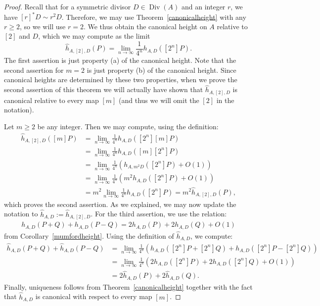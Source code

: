 \documentclass[a4paper, 12pt]{amsart}
\theoremstyle{definition}
\theoremstyle{plain}
\theoremstyle{plain}
\theoremstyle{plain}
\theoremstyle{plain}
\theoremstyle{remark}
\theoremstyle{remark}
\theoremstyle{plain}
\newcommand{\thmref}[1]{Theorem~\ref{#1}}
\newcommand{\corref}[1]{Corollary~\ref{#1}}
\DeclareMathOperator{\Div}{Div}
\begin{document}
	\begin{proof}
		Recall that for a symmetric divisor $D\in\Div(A)$ and an integer $r$, we have $[r]^*D\sim r^2D$. Therefore, we may use \thmref{canonicalheight} with any $r\ge 2$, so we will use $r=2$. We thus obtain the canonical height on $A$ relative to $[2]$ and $D$, which we may compute as the limit
		\begin{equation*}
			\hat{h}_{A,[2],D}(P)=\lim\limits_{n\to\infty}\frac{1}{4^n}h_{A,D}([2^n]P).
		\end{equation*}
		The first assertion is just property (a) of the canonical height. Note that the second assertion for $m=2$ is just property (b) of the canonical height. Since canonical heights are determined by these two properties, when we prove the second assertion of this theorem we will actually have shown that $\hat{h}_{A,[2],D}$ is canonical relative to every map $[m]$ (and thus we will omit the $[2]$ in the notation).
		
		Let $m\ge2$ be any integer. Then we may compute, using the definition:
		\begin{align*}
			\hat{h}_{A,[2],D}([m]P)&=\lim\limits_{n\to\infty}\frac{1}{4^n}h_{A,D}([2^n][m]P)\\
			&=\lim\limits_{n\to\infty}\frac{1}{4^n}h_{A,D}([m][2^n]P)\\
			&=\lim\limits_{n\to\infty}\frac{1}{4^n}\left(h_{A,m^2D}([2^n]P)+O(1)\right)\\
			&=\lim\limits_{n\to\infty}\frac{1}{4^n}\left(m^2h_{A,D}([2^n]P)+O(1)\right)\\
			&=m^2\lim\limits_{n\to\infty}\frac{1}{4^n}h_{A,D}([2^n]P)=m^2\hat{h}_{A,[2],D}(P),
		\end{align*}
		which proves the second assertion. As we explained, we may now update the notation to $\hat{h}_{A,D}:=\hat{h}_{A,[2],D}$. For the third assertion, we use the relation:
		\begin{align*}
			h_{A,D}(P+Q)+h_{A,D}(P-Q)=2h_{A,D}(P)+2h_{A,D}(Q)+O(1)
		\end{align*}
		from \corref{mumfordheight}. Using the definition of $\hat{h}_{A,D}$, we compute:
		\begin{align*}
			\hat{h}_{A,D}(P+Q)+\hat{h}_{A,D}(P-Q)&=\lim\limits_{n\to\infty}\frac{1}{4^n}\left(h_{A,D}([2^n]P+[2^n]Q)+h_{A,D}([2^n]P-[2^n]Q)\right)\\
			&=\lim\limits_{n\to\infty}\frac{1}{4^n}\left(2h_{A,D}([2^n]P)+2h_{A,D}([2^n]Q)+O(1)\right)\\
			&=2\hat{h}_{A,D}(P)+2\hat{h}_{A,D}(Q).
		\end{align*}
		Finally, uniqueness follows from \thmref{canonicalheight} together with the fact that $\hat{h}_{A,D}$ is canonical with respect to every map $[m]$.
	\end{proof}
\end{document}
